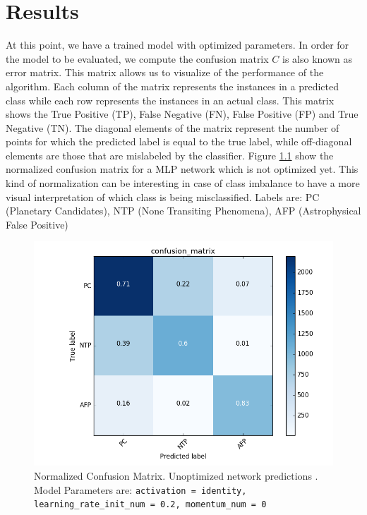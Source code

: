 \chapter{Results}



At this point, we have a trained model with optimized parameters. In order for the model to be evaluated, we compute the confusion matrix $C$ is also known as error matrix. This matrix allows us to visualize of the performance of the algorithm. Each column of the matrix represents the instances in a predicted class while each row represents the instances in an actual class. This matrix shows the True Positive (TP), False Negative (FN), False Positive (FP) and True Negative (TN). The diagonal elements of the matrix represent the number of points for which the predicted label is equal to the true label, while off-diagonal elements are those that are mislabeled by the classifier. Figure \ref{fig:confusionbad} show the normalized confusion matrix for a MLP network which is not optimized yet. This kind of normalization can be interesting in case of class imbalance to have a more visual interpretation of which class is being misclassified. Labels are: PC (Planetary Candidates), NTP (None Transiting Phenomena),  AFP (Astrophysical False Positive) 

\begin{figure}[!h]
\begin{center}
        \includegraphics[width=0.5\textheight]{img/confusion_matrix_bad.png}
        \caption{Normalized Confusion Matrix. Unoptimized network predictions . Model Parameters are: \texttt{activation = identity, learning\_rate\_init\_num = 0.2, momentum\_num = 0}}  \label{fig:confusionbad}
\end{center}
\end{figure}

